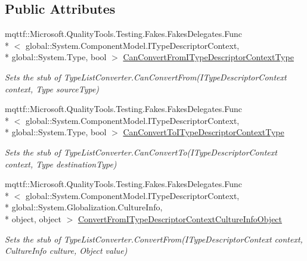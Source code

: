 \subsection*{Public Attributes}
\begin{DoxyCompactItemize}
\item 
mqttf\-::\-Microsoft.\-Quality\-Tools.\-Testing.\-Fakes.\-Fakes\-Delegates.\-Func\\*
$<$ global\-::\-System.\-Component\-Model.\-I\-Type\-Descriptor\-Context, \\*
global\-::\-System.\-Type, bool $>$ \hyperlink{class_system_1_1_component_model_1_1_fakes_1_1_stub_type_list_converter_a28fead0a85f32e33339f8011a4ea672c}{Can\-Convert\-From\-I\-Type\-Descriptor\-Context\-Type}
\begin{DoxyCompactList}\small\item\em Sets the stub of Type\-List\-Converter.\-Can\-Convert\-From(\-I\-Type\-Descriptor\-Context context, Type source\-Type)\end{DoxyCompactList}\item 
mqttf\-::\-Microsoft.\-Quality\-Tools.\-Testing.\-Fakes.\-Fakes\-Delegates.\-Func\\*
$<$ global\-::\-System.\-Component\-Model.\-I\-Type\-Descriptor\-Context, \\*
global\-::\-System.\-Type, bool $>$ \hyperlink{class_system_1_1_component_model_1_1_fakes_1_1_stub_type_list_converter_a6915a9a77c420caf3bfbb059e2622218}{Can\-Convert\-To\-I\-Type\-Descriptor\-Context\-Type}
\begin{DoxyCompactList}\small\item\em Sets the stub of Type\-List\-Converter.\-Can\-Convert\-To(\-I\-Type\-Descriptor\-Context context, Type destination\-Type)\end{DoxyCompactList}\item 
mqttf\-::\-Microsoft.\-Quality\-Tools.\-Testing.\-Fakes.\-Fakes\-Delegates.\-Func\\*
$<$ global\-::\-System.\-Component\-Model.\-I\-Type\-Descriptor\-Context, \\*
global\-::\-System.\-Globalization.\-Culture\-Info, \\*
object, object $>$ \hyperlink{class_system_1_1_component_model_1_1_fakes_1_1_stub_type_list_converter_ab72ead6c9e7863da36d54a1ad8e09a59}{Convert\-From\-I\-Type\-Descriptor\-Context\-Culture\-Info\-Object}
\begin{DoxyCompactList}\small\item\em Sets the stub of Type\-List\-Converter.\-Convert\-From(\-I\-Type\-Descriptor\-Context context, Culture\-Info culture, Object value)\end{DoxyCompactList}\item 

\end{DoxyCompactItemize}
